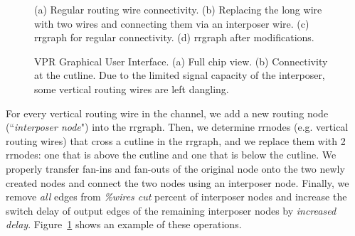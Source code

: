 \documentclass[journal]{IEEEtran}
\begin{document}
\begin{figure}[!t]
\caption{(a) Regular routing wire connectivity. (b) Replacing the long wire with two wires and connecting them via an interposer wire. (c) rrgraph for regular connectivity. (d) rrgraph after modifications.}
\label{fig:rrgraph_ops}
\end{figure}

\begin{figure}[!thpb]
\caption{VPR Graphical User Interface. (a) Full chip view. (b) Connectivity at the cutline. Due to the limited signal capacity of the interposer, some vertical routing wires are left dangling.}
\label{fig:vpr_interposer_gui}
\end{figure}

For every vertical routing wire in the channel, we add a new routing node (``\textit{interposer node}") into the rrgraph. Then, we determine rrnodes (e.g. vertical routing wires) that cross a cutline in the rrgraph, and we replace them with 2 rrnodes: one that is above the cutline and one that is below the cutline. We properly transfer fan-ins and fan-outs of the original node onto the two newly created nodes and connect the two nodes using an interposer node. Finally, we remove \textit{all} edges from \textit{\%wires cut} percent of interposer nodes and increase the switch delay of output edges of the remaining interposer nodes by \textit{increased delay}. Figure~\ref{fig:rrgraph_ops} shows an example of these operations.
\end{document}
